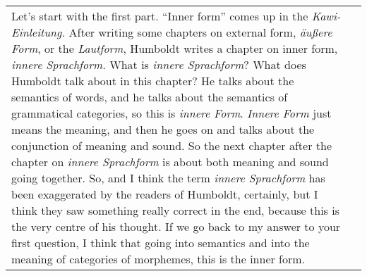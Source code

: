 \documentclass[12pt]{article}
\begin{document}
\begin{flushleft}
\begin{supertabular}{m{0.24415985in}m{5.89766in}}
Let’s start with the first part. “Inner form” comes up in the \textit{Kawi-Einleitung.} After writing some chapters on external form, \textit{äußere Form}, or the \textit{Lautform}, Humboldt writes a chapter on inner form, \textit{innere Sprachform.} What is \textit{innere Sprachform}? What does Humboldt talk about in this chapter? He talks about the semantics of words, and he talks about the semantics of grammatical categories, so this is \textit{innere Form}. \textit{Innere Form} just means the meaning, and then he goes on and talks about the conjunction of meaning and sound. So the next chapter after the chapter on \textit{innere Sprachform} is about both meaning and sound going together. So, and I think the term \textit{innere Sprachform} has been exaggerated by the readers of Humboldt, certainly, but I think they saw something really correct in the end, because this is the very centre of his thought. If we go back to my answer to your first question, I think that going into semantics and into the meaning of categories of morphemes, this is the inner form. 


\end{supertabular}
\end{flushleft}
\end{document}
